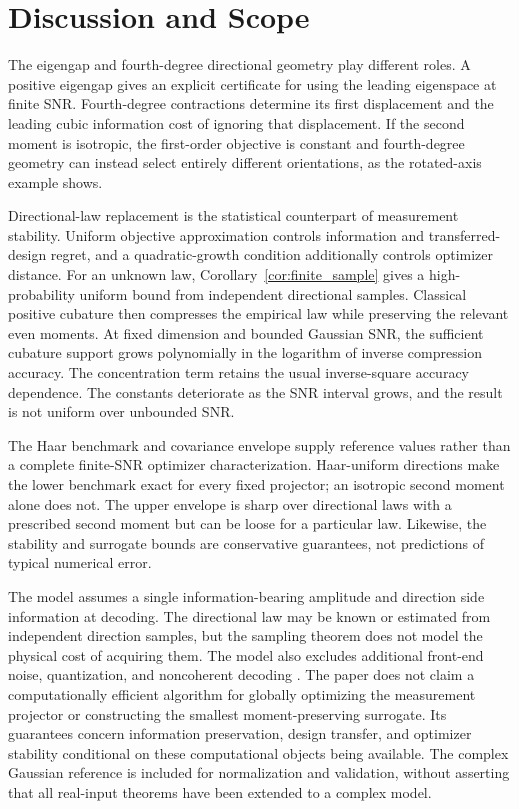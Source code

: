 \documentclass[lettersize,onecolumn]{IEEEtran}
\theoremstyle{remark}
\theoremstyle{definition}
\begin{document}


\section{Discussion and Scope}
The eigengap and fourth-degree directional geometry play different roles. A positive eigengap gives an explicit certificate for using the leading eigenspace at finite SNR. Fourth-degree contractions determine its first displacement and the leading cubic information cost of ignoring that displacement. If the second moment is isotropic, the first-order objective is constant and fourth-degree geometry can instead select entirely different orientations, as the rotated-axis example shows.

Directional-law replacement is the statistical counterpart of measurement stability. Uniform objective approximation controls information and transferred-design regret, and a quadratic-growth condition additionally controls optimizer distance. For an unknown law, Corollary~\ref{cor:finite_sample} gives a high-probability uniform bound from independent directional samples. Classical positive cubature then compresses the empirical law while preserving the relevant even moments. At fixed dimension and bounded Gaussian SNR, the sufficient cubature support grows polynomially in the logarithm of inverse compression accuracy. The concentration term retains the usual inverse-square accuracy dependence. The constants deteriorate as the SNR interval grows, and the result is not uniform over unbounded SNR.

The Haar benchmark and covariance envelope supply reference values rather than a complete finite-SNR optimizer characterization. Haar-uniform directions make the lower benchmark exact for every fixed projector; an isotropic second moment alone does not. The upper envelope is sharp over directional laws with a prescribed second moment but can be loose for a particular law. Likewise, the stability and surrogate bounds are conservative guarantees, not predictions of typical numerical error.

The model assumes a single information-bearing amplitude and direction side information at decoding. The directional law may be known or estimated from independent direction samples, but the sampling theorem does not model the physical cost of acquiring them. The model also excludes additional front-end noise, quantization, and noncoherent decoding \cite{zhengtse2002}. The paper does not claim a computationally efficient algorithm for globally optimizing the measurement projector or constructing the smallest moment-preserving surrogate. Its guarantees concern information preservation, design transfer, and optimizer stability conditional on these computational objects being available. The complex Gaussian reference is included for normalization and validation, without asserting that all real-input theorems have been extended to a complex model.
\end{document}
